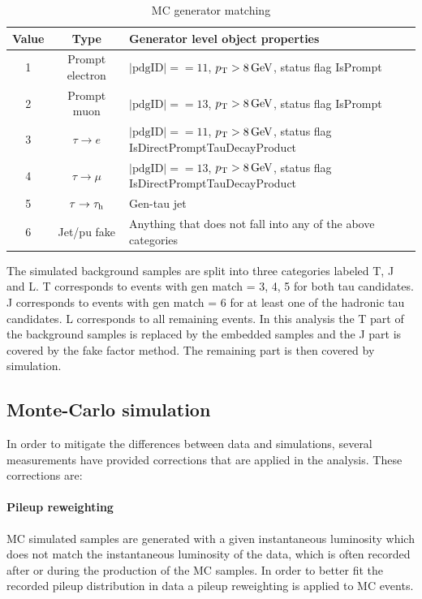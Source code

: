 \begin{table}[]
    \centering
    \begin{tabular}{|c|c|l|}
        \hline
        Value & Type & Generator level object properties \\
        \hline
        1 & Prompt electron & $|\mathrm{pdgID}|==11$, $p_{\mathrm{T}} > 8 \,\mathrm{GeV}$, status flag IsPrompt\\
        \hline
        2 & Prompt muon & $|\mathrm{pdgID}|==13$, $p_{\mathrm{T}} > 8 \,\mathrm{GeV}$, status flag IsPrompt\\
        \hline
        3 & $\tau \rightarrow e$ & $|\mathrm{pdgID}|==11$, $p_{\mathrm{T}} > 8 \,\mathrm{GeV}$, status flag IsDirectPromptTauDecayProduct\\
        \hline
        4 & $\tau \rightarrow \mu$ & $|\mathrm{pdgID}|==13$, $p_{\mathrm{T}} > 8 \,\mathrm{GeV}$, status flag IsDirectPromptTauDecayProduct\\
        \hline
        5 & $\tau \rightarrow \tau_{\rm h}$ & Gen-tau jet \\
        \hline
        6 & Jet/pu fake & Anything that does not fall into any of the above categories \\
        \hline
    \end{tabular}
    \caption{MC generator matching}
    \label{tab:mc_matching}
\end{table}

The simulated background samples are split into three categories labeled T, J and L. T corresponds to events with gen match = 3, 4, 5 for both tau candidates. J corresponds to events with gen match = 6 for at least one of the hadronic tau candidates. L corresponds to all remaining events. In this analysis the T part of the background samples is replaced by the embedded samples and the J part is covered by the fake factor method. The remaining part is then covered by simulation.


\subsection{Monte-Carlo simulation}
\label{sec:MC_corr}

In order to mitigate the differences between data and simulations, several measurements have provided corrections that are applied in the analysis. These corrections are:

\paragraph{Pileup reweighting} MC simulated samples are generated with a given instantaneous luminosity which does not match the instantaneous luminosity of the data, which is often recorded after or during the production of the MC samples. In order to better fit the recorded pileup distribution in data a pileup reweighting is applied to MC events.

